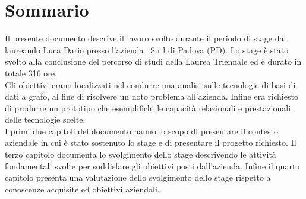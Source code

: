 
\cleardoublepage
{}
{}
\begingroup
\let\clearpage\relax
\let\cleardoublepage\relax
\let\cleardoublepage\relax

\chapter*{Sommario}

Il presente documento descrive il lavoro svolto durante il periodo di stage dal laureando Luca Dario presso l'azienda \azienda\ S.r.l di Padova (PD). Lo stage è stato svolto alla conclusione del percorso di studi della Laurea Triennale ed è durato in totale 316 ore.\\
Gli obiettivi erano focalizzati nel condurre una analisi sulle tecnologie di basi di dati a grafo, al fine di risolvere un noto problema all'azienda. Infine era richiesto di produrre un prototipo che esemplifichi le capacità relazionali e prestazionali delle tecnologie scelte.\\
I primi due capitoli del documento hanno lo scopo di presentare il contesto aziendale in cui è stato sostenuto lo stage e di presentare il progetto richiesto. Il terzo capitolo documenta lo svolgimento dello stage descrivendo le attività fondamentali svolte per soddisfare gli obiettivi posti dall'azienda. Infine il quarto capitolo presenta una valutazione dello svolgimento dello stage rispetto a conoscenze acquisite ed obiettivi aziendali.
%
%

\endgroup			

\vfill

